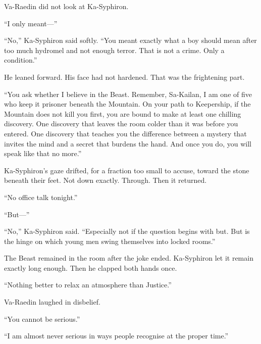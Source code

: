 Va-Raedin did not look at Ka-Syphiron.\par

“I only meant—”\par

“No,” Ka-Syphiron said softly.
“You meant exactly what a boy should mean after too much hydromel and not enough terror.
That is not a crime.
Only a condition.”\par

He leaned forward.
His face had not hardened.
That was the frightening part.\par

“You ask whether I believe in the Beast.
Remember, Sa-Kailan, I am one of five who keep it prisoner beneath the Mountain.
On your path to Keepership, if the Mountain does not kill you first, you are bound to make at least one chilling discovery.
One discovery that leaves the room colder than it was before you entered.
One discovery that teaches you the difference between a mystery that invites the mind and a secret that burdens the hand.
And once you do, you will speak like that no more.”\par

Ka-Syphiron’s gaze drifted, for a fraction too small to accuse, toward the stone beneath their feet.
Not down exactly.
Through.
Then it returned.\par

“No office talk tonight.”\par

“But—”\par

“No,” Ka-Syphiron said.
“Especially not if the question begins with but.
But is the hinge on which young men swing themselves into locked rooms.”\par

The Beast remained in the room after the joke ended.
Ka-Syphiron let it remain exactly long enough.
Then he clapped both hands once.\par




“Nothing better to relax an atmosphere than Justice.”\par

Va-Raedin laughed in disbelief.\par

“You cannot be serious.”\par

“I am almost never serious in ways people recognise at the proper time.”\par

